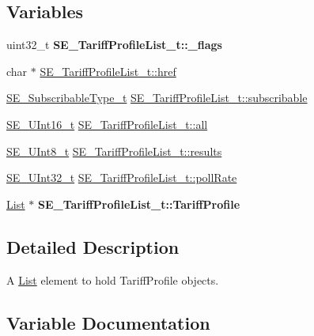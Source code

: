 \subsection*{Variables}
\begin{DoxyCompactItemize}
\item 
\mbox{\label{group__TariffProfileList_ga332c6ffc3f82641cff3b0b68737118d1}} 
uint32\+\_\+t {\bfseries S\+E\+\_\+\+Tariff\+Profile\+List\+\_\+t\+::\+\_\+flags}
\item 
char $\ast$ \hyperlink{group__TariffProfileList_ga4bb7a09526e0326e0467e6964ffc5836}{S\+E\+\_\+\+Tariff\+Profile\+List\+\_\+t\+::href}
\item 
\hyperlink{group__SubscribableType_ga5c41f553d369710ed34619266bf2551e}{S\+E\+\_\+\+Subscribable\+Type\+\_\+t} \hyperlink{group__TariffProfileList_gaa153bac887e9928acdfee8db13723c96}{S\+E\+\_\+\+Tariff\+Profile\+List\+\_\+t\+::subscribable}
\item 
\hyperlink{group__UInt16_gac68d541f189538bfd30cfaa712d20d29}{S\+E\+\_\+\+U\+Int16\+\_\+t} \hyperlink{group__TariffProfileList_gad7821bca59072f3810fd844e6081b99f}{S\+E\+\_\+\+Tariff\+Profile\+List\+\_\+t\+::all}
\item 
\hyperlink{group__UInt8_gaf7c365a1acfe204e3a67c16ed44572f5}{S\+E\+\_\+\+U\+Int8\+\_\+t} \hyperlink{group__TariffProfileList_ga7865e883422f7ffd3ce157762c025a94}{S\+E\+\_\+\+Tariff\+Profile\+List\+\_\+t\+::results}
\item 
\hyperlink{group__UInt32_ga70bd4ecda3c0c85d20779d685a270cdb}{S\+E\+\_\+\+U\+Int32\+\_\+t} \hyperlink{group__TariffProfileList_gad9e0c75fafd8450f4d505c965c3a889d}{S\+E\+\_\+\+Tariff\+Profile\+List\+\_\+t\+::poll\+Rate}
\item 
\mbox{\label{group__TariffProfileList_ga16fca94e92b44e2b3542c2e5ac322107}} 
\hyperlink{structList}{List} $\ast$ {\bfseries S\+E\+\_\+\+Tariff\+Profile\+List\+\_\+t\+::\+Tariff\+Profile}
\end{DoxyCompactItemize}


\subsection{Detailed Description}
A \hyperlink{structList}{List} element to hold Tariff\+Profile objects. 

\subsection{Variable Documentation}
\mbox{\label{group__TariffProfileList_gad7821bca59072f3810fd844e6081b99f}} 
